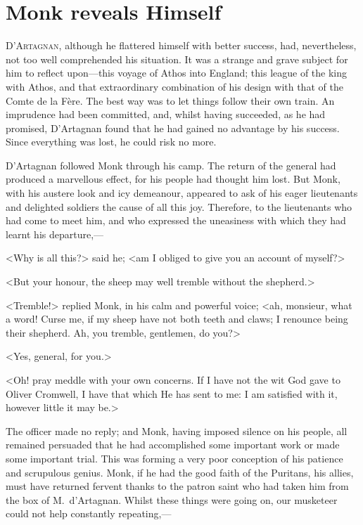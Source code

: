 \chapter{Monk reveals Himself}

\lettrine{D}{'Artagnan}, although he flattered himself with better success, had, nevertheless, not too well comprehended his situation. It was a strange and grave subject for him to reflect upon—this voyage of Athos into England; this league of the king with Athos, and that extraordinary combination of his design with that of the Comte de la Fère. The best way was to let things follow their own train. An imprudence had been committed, and, whilst having succeeded, as he had promised, D'Artagnan found that he had gained no advantage by his success. Since everything was lost, he could risk no more.

D'Artagnan followed Monk through his camp. The return of the general had produced a marvellous effect, for his people had thought him lost. But Monk, with his austere look and icy demeanour, appeared to ask of his eager lieutenants and delighted soldiers the cause of all this joy. Therefore, to the lieutenants who had come to meet him, and who expressed the uneasiness with which they had learnt his departure,—

<Why is all this?> said he; <am I obliged to give you an account of myself?>

<But your honour, the sheep may well tremble without the shepherd.>

<Tremble!> replied Monk, in his calm and powerful voice; <ah, monsieur, what a word! Curse me, if my sheep have not both teeth and claws; I renounce being their shepherd. Ah, you tremble, gentlemen, do you?>

<Yes, general, for you.>

<Oh! pray meddle with your own concerns. If I have not the wit God gave to Oliver Cromwell, I have that which He has sent to me: I am satisfied with it, however little it may be.>

The officer made no reply; and Monk, having imposed silence on his people, all remained persuaded that he had accomplished some important work or made some important trial. This was forming a very poor conception of his patience and scrupulous genius. Monk, if he had the good faith of the Puritans, his allies, must have returned fervent thanks to the patron saint who had taken him from the box of M.~d'Artagnan. Whilst these things were going on, our musketeer could not help constantly repeating,—

